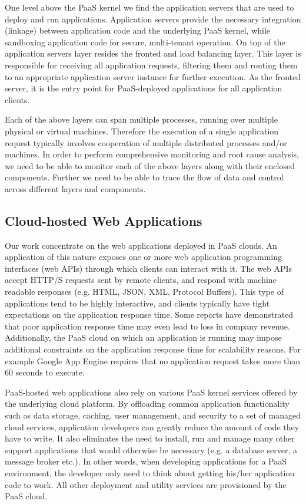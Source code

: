 One level above the PaaS kernel we find the application servers that are used to deploy and run
applications. Application servers provide the necessary integration (linkage) between application code and the
underlying PaaS kernel, while sandboxing application code for secure, multi-tenant operation. On top
of the application servers layer resides the fronted and load balancing layer. This layer is responsible
for receiving all application requests, filtering them and routing them to an appropriate application
server instance for further execution. As the fronted server, it is the entry point for PaaS-deployed
applications for all application clients.

Each of the above layers can span multiple processes, running over multiple physical or virtual
machines. Therefore the execution of a single application request typically involves cooperation
of multiple distributed processes and/or machines. In order to perform comprehensive monitoring
and root cause analysis, we need to be able to monitor each of the above layers along with their
enclosed components. Further we need to be able to trace the flow of data and control
across different layers and components.

\subsection{Cloud-hosted Web Applications}
Our work concentrate on the web applications deployed in PaaS clouds. An application of this nature
exposes one or more web application programming interfaces (web APIs) through which clients can
interact with it. The web APIs accept HTTP/S requests sent by remote clients, and respond with
machine readable responses (e.g. HTML, JSON, XML, Protocol Buffers). This type of applications tend to be highly
interactive, and clients typically have tight expectations on the application response time. Some
reports have demonstrated that poor application response time may even lead to loss in company
revenue. Additionally, the PaaS 
cloud on which an application is running may impose additional constraints on the application
response time for scalability reasons. For example Google App Engine requires that no application
request takes more than 60 seconds to execute.

PaaS-hosted web applications also rely on various PaaS kernel services offered by the underlying
cloud platform. By offloading common application functionality such as data storage, caching,
user management, and security to a set of managed cloud services, application developers
can greatly reduce the amount of code they have to write. It also eliminates the need to install, run and
manage many other support applications that would otherwise be necessary (e.g. a database server, 
a message broker etc.). In other words, when developing applications for a PaaS environment, the
developer only need to think about getting his/her application code to work. All other deployment
and utility services are provisioned by the PaaS cloud. 

